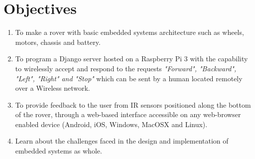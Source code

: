 \section{Objectives}

\begin{enumerate}
	\item To make a rover with basic embedded systems architecture such as wheels, motors, chassis and battery.
	
	\item To program a Django server hosted on a Raspberry Pi 3 with the capability to wirelessly accept and respond to the requests \textit{"Forward", "Backward", "Left", "Right" and "Stop"} which can be sent by a human located remotely over a Wireless network.
	
	\item To provide feedback to the user from IR sensors positioned along the bottom of the rover, through a web-based interface accessible on any web-browser enabled device (Android, iOS, Windows, MacOSX and Linux).
	
	\item Learn about the challenges faced in the design and implementation of embedded systems as whole.
	
\end{enumerate}